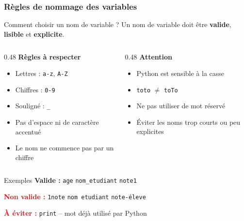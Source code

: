 \documentclass[10pt]{beamer}
\begin{document}
\begin{frame}[containsverbatim]
	\frametitle{Règles de nommage des variables}
	\begin{block}{Comment choisir un nom de variable ?}
		Un nom de variable doit être \textbf{valide}, \textbf{lisible} et \textbf{explicite}.
	\end{block}
	\vspace{0.25cm}
	\begin{columns}[T]
		\begin{column}{0.48\textwidth}
			\textbf{Règles à respecter}
			
			\begin{itemize}
				\item Lettres : \texttt{a-z}, \texttt{A-Z}
				\item Chiffres : \texttt{0-9}
				\item Souligné : \texttt{\_}
				\item Pas d'espace ni de caractère accentué
				\item Le nom ne commence pas par un chiffre
			\end{itemize}
		\end{column}
		\begin{column}{0.48\textwidth}
			\textbf{Attention}
			
			\begin{itemize}
				\item Python est sensible à la casse
				\item \texttt{toto} $\neq$ \texttt{toTo}
				\item Ne pas utiliser de mot réservé
				\item Éviter les noms trop courts ou peu explicites
			\end{itemize}
		\end{column}
	\end{columns}
	
	\vspace{0.25cm}
	
\begin{exampleblock}{Exemples}
	\centering
	\textcolor{green!60!black}{\textbf{\checkmark Valide :}}
	\quad \texttt{age} \quad \texttt{nom\_etudiant} \quad \texttt{note1}
	
	
	\vspace{0.15cm}
	
	\textcolor{red}{\textbf{\texttimes Non valide :}}
	\quad \texttt{1note} \quad \texttt{nom etudiant} \quad \texttt{note-éleve}
	
	\vspace{0.15cm}
	
	\textcolor{red}{\textbf{\texttimes À éviter :}}
	\quad \texttt{print}
	\quad -- mot déjà utilisé par Python
	
	
\end{exampleblock}
\end{frame}
\end{document}
